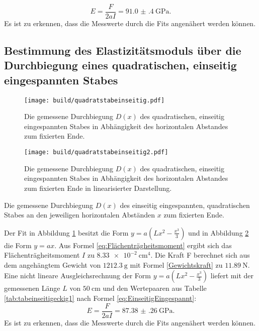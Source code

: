 \begin{displaymath}
	E = \frac{F}{2 a I}= \SI{91.0(4)}{\giga\pascal}\text{.}
\end{displaymath}
Es ist zu erkennen, dass die Messwerte durch die Fits angenähert werden können.



\subsection{Bestimmung des Elastizitätsmoduls über die Durchbiegung eines quadratischen, einseitig eingespannten Stabes}

\begin{figure}
	\centering
	\caption{Die gemessene Durchbiegung $D(x)$ des quadratischen, einseitig eingespannten Stabes
	 in Abhängigkeit des horizontalen Abstandes zum fixierten Ende.}
	\texttt{[image: build/quadratstabeinseitig.pdf]}
	\label{fig:quadratisch}
\end{figure}
\begin{figure}
	\centering
	\caption{Die gemessene Durchbiegung $D(x)$ des quadratischen, einseitig eingespannten Stabes
	 in Abhängigkeit des horizontalen Abstandes zum fixierten Ende in linearisierter Darstellung.}
	\texttt{[image: build/quadratstabeinseitig2.pdf]}
	\label{fig:quadratischlinear}
\end{figure}
\begin{table}
	\caption{Die gemessene Durchbiegung $D(x)$ des einseitig eingespannten, quadratischen Stabes an den jeweiligen horizontalen Abständen $x$ zum fixierten Ende.}
	\begin{minipage}{0.5\textwidth}
		\centering
		
	\end{minipage}
	\begin{minipage}{0.5\textwidth}
		\centering
		
	\end{minipage}
\end{table}
Der Fit in Abbildung \ref{fig:quadratisch} besitzt die Form $y = a ( L x^2 - \frac{x^3}{3} ) $ und in Abbildung \ref{fig:quadratischlinear} die Form $y=a x$. Aus Formel \eqref{eq:Flächenträgheitsmoment} ergibt sich das Flächenträgheitsmoment $I$ zu $\SI{8.33e-2}{\centi\meter\tothe{4}}$. Die Kraft F berechnet sich aus dem angehängtem Gewicht von $\SI{1212.3}{\gram}$ mit Formel \eqref{Gewichtskraft} zu $\SI{11.89}{\newton}$. Eine nicht lineare Ausgleichsrechnung der Form $y = a ( L x^2 - \frac{x^3}{3})$ liefert mit der gemessenen Länge $L$ von $\SI{50}{\centi\meter}$ und den Wertepaaren aus Tabelle \ref{tab:tabeinseitigeckig1} nach Formel \eqref{eq:EinseitigEingespannt}:
\begin{displaymath}
E = \frac{F}{2 a I}= \SI{87.38(26)}{\giga\pascal}\text{.}
\end{displaymath}
Es ist zu erkennen, dass die Messwerte durch die Fits angenähert werden können.




